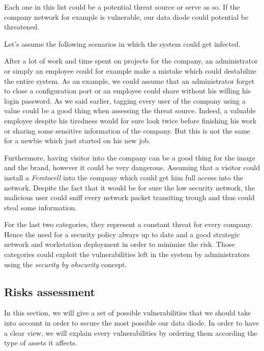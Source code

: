 \documentclass[a4paper,10pt]{article}
\begin{document}
Each one in this list could be a potential threat source or serve as so. If the company network for example is vulnerable, our data diode could potential be threatened.

Let's assume the following scenarios in which the system could get infected.

After a lot of work and time spent on projects for the company, an administrator or simply an employee could for example make a mistake which could destabilize the entire system. As an example, we could assume that an administrator forget to close a configuration port or an employee could share without his willing his login password.
As we said earlier, tagging every user of the company using a value could be a good thing when assessing the threat source. Indeed, a valuable employee despite his tiredness would for sure look twice before finishing his work or sharing some sensitive information of the company. But this is not the same for a newbie which just started on his new job.

Furthermore, having visitor into the company can be a good thing for the image and the brand, however it could be very dangerous. Assuming that a visitor could install a \emph{Femtocell} into the company which could get him full access into the network. Despite the fact that it would be for sure the low security network, the malicious user could sniff every network packet transiting trough and thus could steal some information.

For the last two categories, they represent a constant threat for every company. Hence the need for a security policy always up to date and a good strategic network and workstation deployment in order to minimize the risk. Those categories could exploit the vulnerabilities left in the system by administrators using the \emph{security by obscurity} concept.

\subsection{Risks assessment}
In this section, we will give a set of possible vulnerabilities that we should take into account in order to secure the most possible our data diode. In order to have a clear view, we will explain every vulnerabilities by ordering them according the type of assets it affects.
\end{document}
